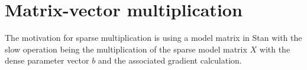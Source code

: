 \section{Matrix-vector multiplication}

The motivation for sparse multiplication is using a model matrix in Stan
with the slow operation being the multiplication of the sparse model matrix $X$
with the dense parameter vector $b$ and the associated gradient
calculation.




